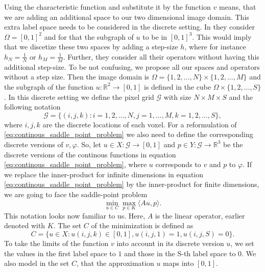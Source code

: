 \documentclass{scrreprt}
\begin{document}
        Using the characteristic function and substitute it by the function $v$ means, that we are adding an additional space to our two dimensional image domain. This extra label space needs to be considered in the discrete setting. In \cite{Pock-et-al-iccv09} they consider $\Omega = [0, 1]^{2}$ and for that the subgraph of $u$ to be in $[0, 1]^{3}$. This would imply that we discetize these two spaces by adding a step-size $h$, where for instance $h_{N} = \frac{1}{N}$ or $h_{M} = \frac{1}{M}$. Further, they consider all their operators without having this additional step-size. To be not confusing, we propose all our spaces and operators without a step size. Then the image domain is $\Omega = \{1, 2, ..., N\} \times \{1, 2, ..., M\}$ and the subgraph of the function $u: \mathbb{R}^{2} \longrightarrow [0, 1]$ is defined in the cube $\Omega \times \{1, 2, ..., S\}$. In this discrete setting we define the pixel grid $\mathcal{G}$ with size $N \times M \times S$ and the following notation
            $$
                \mathcal{G} = \bigg\{ (i , j , k ): i = 1, 2, ..., N, j = 1, ..., M, k = 1, 2, ..., S \bigg\},
            $$
        where $i, j, k$ are the discrete locations of each voxel. For a reformulation of \ref{eq:continous_saddle_point_problem} we also need to define the corresponding discrete versions of $v, \varphi$. So, let $u \in X: \mathcal{G} \longrightarrow [0, 1]$ and $p \in Y: \mathcal{G} \longrightarrow \mathbb{R}^{3}$ be the discrete versions of the continous functions in equation \ref{eq:continous_saddle_point_problem}, where $u$ corresponds to $v$ and $p$ to $\varphi$. If we replace the inner-product for infinite dimensions in equation \ref{eq:continous_saddle_point_problem} by the inner-product for finite dimensions, we are going to face the saddle-point problem
            \begin{equation}
                \min_{u \in C} \max_{p \in K} \langle Au, p \rangle.
            \label{eq:mumford_shah_saddle_point_problem}
            \end{equation}
        This notation looks now familiar to us. Here, $A$ is the linear operator, earlier denoted with $K$. The set $C$ of the minimization is defined as
            \begin{equation}
                C = \{ u \in X: u(i,j,k) \in [0,1], u(i, j, 1) = 1, u(i, j, S) = 0 \}.
            \end{equation}
        To take the limits of the function $v$ into account in its discrete version $u$, we set the values in the first label space to $1$ and those in the S-th label space to $0$. We also model in the set $C$, that the approximation $u$ maps into $[0, 1]$.
\end{document}

